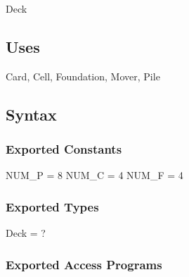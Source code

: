 \documentclass[12pt,fleqn]{article}
\begin{document}
Deck

\subsection* {Uses}

Card, Cell, Foundation, Mover, Pile

\subsection* {Syntax}

\subsubsection* {Exported Constants}
NUM\_P = 8
NUM\_C = 4
NUM\_F = 4

\subsubsection* {Exported Types}
Deck = ?

\subsubsection* {Exported Access Programs}
\end{document}
